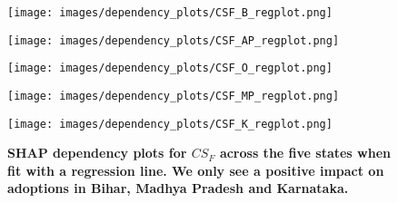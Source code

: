 \documentclass[manuscript,screen]{acmart}
\begin{document}
\begin{appendices}
\begin{figure*}[hp]
    \centering
    \begin{minipage}{0.19\textwidth}
        \centering
        \texttt{[image: images/dependency\_plots/CSF\_B\_regplot.png]}
        \label{fig:csd_bihar}
    \end{minipage}
    \begin{minipage}{0.19\textwidth}
        \centering
        \texttt{[image: images/dependency\_plots/CSF\_AP\_regplot.png]}
        \label{fig:csd_ap}
    \end{minipage}
    \begin{minipage}{0.19\textwidth}
        \centering
        \texttt{[image: images/dependency\_plots/CSF\_O\_regplot.png]}
        \label{fig:csd_odisha}
    \end{minipage}
    \begin{minipage}{0.19\textwidth}
        \centering
        \texttt{[image: images/dependency\_plots/CSF\_MP\_regplot.png]}
        \label{fig:csd_mp}
    \end{minipage}
    \begin{minipage}{0.19\textwidth}
        \centering
        \texttt{[image: images/dependency\_plots/CSF\_K\_regplot.png]}
        \label{fig:csd_karnataka}
    \end{minipage}
    \caption{\textbf{SHAP dependency plots for $CS_{F}$ across the five states when fit with a regression line. We only see a positive impact on adoptions in Bihar, Madhya Pradesh and Karnataka.}}
    \label{fig:dep_csf}
\end{figure*}


\end{appendices}
\end{document}
